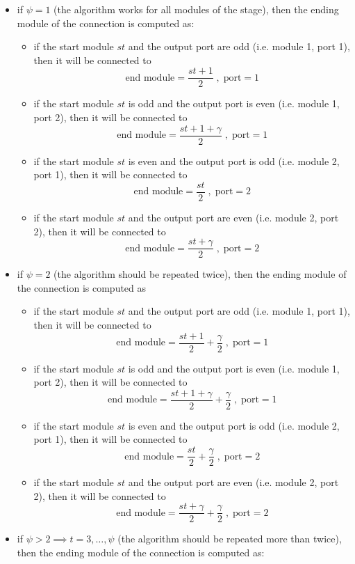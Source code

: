 \documentclass{ltxdoc} %
\begin{document}
\begin{itemize}
\item if $\psi=1$ (the algorithm works for all modules of the stage), then the ending module of the connection is computed as:
\begin{itemize}
\item if the start module $st$ and the output port are odd (i.e. module 1, port 1), then it will be connected to  
\[\textrm{end module}=\dfrac{st+1}{2} \; , \; \textrm{port}=1 \]
\item if the start module $st$ is odd and the output port is even (i.e. module 1, port 2), then it will be connected to  
\[\textrm{end module}=\dfrac{st+1+\gamma}{2}\; , \; \textrm{port}=1 \]
\item if the start module $st$ is even and the output port is odd (i.e. module 2, port 1), then it will be connected to  
\[\textrm{end module}=\dfrac{st}{2}  \; , \; \textrm{port}=2 \]
\item if the start module $st$ and the output port are even (i.e. module 2, port 2), then it will be connected to  
\[\textrm{end module}=\dfrac{st+\gamma}{2}\; , \; \textrm{port}=2 \]
\end{itemize}
\item if $\psi=2$ (the algorithm should be repeated twice), then the ending module of the connection is computed as
\begin{itemize}
\item if the start module $st$ and the output port are odd (i.e. module 1, port 1), then it will be connected to  
\[\textrm{end module}=\dfrac{st+1}{2}+\dfrac{\gamma}{2} \; , \; \textrm{port}=1 \]
\item if the start module $st$ is odd and the output port is even (i.e. module 1, port 2), then it will be connected to  
\[\textrm{end module}=\dfrac{st+1+\gamma}{2}+\dfrac{\gamma}{2}\; , \; \textrm{port}=1 \]
\item if the start module $st$ is even and the output port is odd (i.e. module 2, port 1), then it will be connected to  
\[\textrm{end module}=\dfrac{st}{2}+\dfrac{\gamma}{2}  \; , \; \textrm{port}=2 \]
\item if the start module $st$ and the output port are even (i.e. module 2, port 2), then it will be connected to  
\[\textrm{end module}=\dfrac{st+\gamma}{2}+\dfrac{\gamma}{2}\; , \; \textrm{port}=2 \]
\end{itemize}
\item if $\psi>2\implies t=3,\ldots, \psi$ (the algorithm should be repeated more than twice), then the ending module of the connection is computed as:

\end{itemize}
\end{document}

